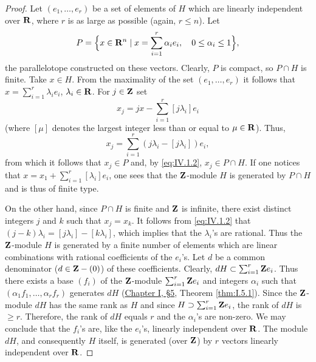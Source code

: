 \begin{proof}
Let $(e_{1},\ldots,e_{r})$ be a set of elements of $H$ which are linearly
independent over $\mathbf{R}$, where $r$ is as large as possible (again, $r\leq n$).
Let
\begin{equation}
P=\Bigl\{x\in\mathbf{R}^{n}\mid x=\sum_{i=1}^{r}\alpha_{i}e_{i},\quad
0\leq\alpha_{i}\leq1\Bigr\},
\label{eq:IV.1.1}
\end{equation}
the parallelotope constructed on these vectors. Clearly, $P$ is compact, so
$P\cap H$ is finite. Take $x\in H$. From the maximality of the set
$(e_{1},\ldots,e_{r})$ it follows that $x=\sum_{i=1}^{r}\lambda_{i}e_{i}$,
$\lambda_{i}\in\mathbf{R}$. For $j\in\mathbf{Z}$ set
\begin{equation}
x_{j}=jx-\sum_{i=1}^{r}[j\lambda_{i}]e_{i}
\label{eq:IV.1.2}
\end{equation}
(where $[\mu]$ denotes the largest integer less than or equal to $\mu\in\mathbf{R}$).
Thus,
\[
x_{j}=\sum_{i=1}^{r}(j\lambda_{i}-[j\lambda_{i}])e_{i},
\]
from which it follows that $x_{j}\in P$ and, by \eqref{eq:IV.1.2},
$x_{j}\in P\cap H$. If one notices that
$x=x_{1}+\sum_{i=1}^{r}[\lambda_{i}]e_{i}$, one sees that the $\mathbf{Z}$-module $H$
is generated by $P\cap H$ and is thus of finite type.

On the other hand, since $P\cap H$ is finite and $\mathbf{Z}$ is infinite, there
exist distinct integers $j$ and $k$ such that $x_{j}=x_{k}$. It follows from
\eqref{eq:IV.1.2} that
$(j-k)\lambda_{i}=[j\lambda_{i}]-[k\lambda_{i}]$, which implies that the
$\lambda_{i}$'s are rational. Thus the $\mathbf{Z}$-module $H$ is generated by a
finite number of elements which are linear combinations with rational
coefficients of the $e_{i}$'s. Let $d$ be a common denominator
($d\in\mathbf{Z}-(0)$) of these coefficients. Clearly,
$dH\subset\sum_{i=1}^{r}\mathbf{Z} e_{i}$. Thus there exists a base $(f_{i})$ of the
$\mathbf{Z}$-module $\sum_{i=1}^{r}\mathbf{Z} e_{i}$ and integers $\alpha_{i}$ such that
$(\alpha_{1}f_{1},\ldots,\alpha_{r}f_{r})$ generates $dH$ (\hyperref[sec:1.5]{Chapter I, §5},
Theorem \ref{thm:I.5.1}). Since the $\mathbf{Z}$-module $dH$ has the same rank as $H$
and since $H\supset\sum_{i=1}^{r}\mathbf{Z} e_{i}$, the rank of $dH$ is $\geq r$.
Therefore, the rank of $dH$ equals $r$ and the $\alpha_{i}$'s are non-zero.
We may conclude that the $f_{i}$'s are, like the $e_{i}$'s, linearly
independent over $\mathbf{R}$. The module $dH$, and consequently $H$ itself, is
generated (over $\mathbf{Z}$) by $r$ vectors linearly independent over $\mathbf{R}$.
\end{proof}

